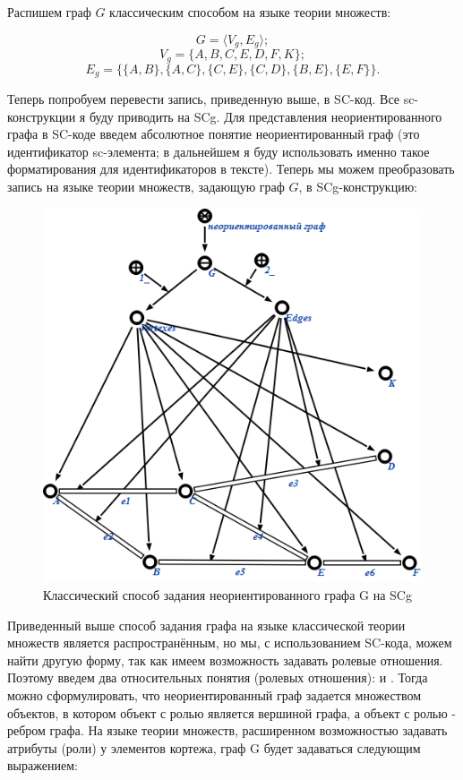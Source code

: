 Распишем граф $G$ классическим способом на языке теории множеств:

\[ G = \langle V_g, E_g \rangle; \]
\[ V_g = \{A, B, C, E, D, F, K\}; \]
\[ E_g = \{\{A, B\}, \{A, C\}, \{C, E\}, \{C, D\}, \{B, E\}, \{E, F\}\}. \]

Теперь попробуем перевести запись, приведенную выше, в SC-код. Все
sc-конструкции я буду приводить на SCg. Для представления
неориентированного графа в SC-коде введем абсолютное понятие
неориентированный граф (это идентификатор sc-элемента; в дальнейшем я
буду использовать именно такое форматирования для идентификаторов в
тексте). Теперь мы можем преобразовать запись на языке теории
множеств, задающую граф $G$, в SCg-конструкцию:

\begin{figure}[h]
  \centering
  \includegraphics[scale=0.6]{images/2/Undirected_graph_Classical_method}
  \caption{Классический способ задания неориентированного графа G на SCg}
  \label{fig:Undirected_graph_Classical_method}
\end{figure}

Приведенный выше способ задания графа на языке классической теории
множеств является распространённым, но мы, с использованием SC-кода,
можем найти другую форму, так как имеем возможность задавать ролевые
отношения. Поэтому введем два относительных понятия (ролевых
отношения):  и . Тогда можно сформулировать,
что неориентированный граф задается множеством объектов, в котором
объект с ролью  является вершиной графа, а объект с
ролью  - ребром графа. На языке теории множеств,
расширенном возможностью задавать атрибуты (роли) у элементов кортежа,
граф G будет задаваться следующим выражением:

